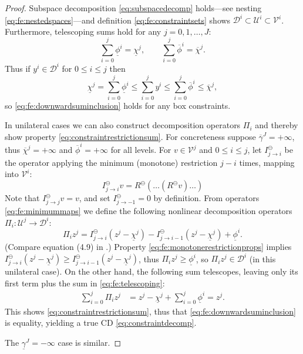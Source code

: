 \documentclass[letterpaper,final,12pt,reqno]{amsart}
\theoremstyle{cstyle}
\theoremstyle{cstyle*}
\theoremstyle{dstyle}
\numberwithin{equation}{section}
\numberwithin{figure}{section}
\numberwithin{table}{section}
\numberwithin{theorem}{section}
\newcommand{\cV}{\mathcal{V}}
\newcommand{\minR}{R^{\bm{\ominus}}}
\begin{document}
\begin{proof}  Subspace decomposition \eqref{eq:subspacedecomp} holds---see nesting \eqref{eq:fe:nestedspaces}---and definition \eqref{eq:fe:constraintsets} shows $\mathcal{D}^i \subset \mathcal{U}^i \subset \cV^i$.  Furthermore, telescoping sums hold for any $j=0,1,\dots,J$:
\begin{equation}
\sum_{i=0}^j \underline{\phi}^i = \underline{\chi}^j, \qquad \sum_{i=0}^j \overline{\phi}^i = \overline{\chi}^j.  \label{eq:fe:telescoping}
\end{equation}
Thus if $y^i \in \mathcal{D}^i$ for $0 \le i \le j$ then
\begin{equation}
\underline{\chi}^j = \sum_{i=0}^j \underline{\phi}^i \le \sum_{i=0}^j y^i \le \sum_{i=0}^j \overline{\phi}^i \le \overline{\chi}^j, \label{eq:fe:lemmaordering}
\end{equation}
so \eqref{eq:fe:downwardsuminclusion} holds for any box constraints.

In unilateral cases we can also construct decomposition operators $\Pi_i$ and thereby show property \eqref{eq:constraintrestrictionsum}.  For concreteness suppose $\overline{\gamma}^J=+\infty$, thus $\overline{\chi}^j=+\infty$ and $\overline{\phi}^i = +\infty$ for all levels.  For $v\in \mathcal{V}^j$ and $0\le i \le j$, let $I_{j\to i}^\ominus$ be the operator applying the minimum (monotone) restriction $j-i$ times, mapping into $\mathcal{V}^i$:
\begin{equation}
I_{j\to i}^\ominus v = \minR(\dots(\minR v)\dots)  \label{eq:fe:minimummaps}
\end{equation}
Note that $I_{j\to j}^\ominus v = v$, and set $I_{j\to -1}^\ominus=0$ by definition.  From operators \eqref{eq:fe:minimummaps} we define the following nonlinear decomposition operators $\Pi_i:\mathcal{U}^j \to \mathcal{D}^i$:
\begin{equation}
\Pi_i z^j = I_{j\to i}^\ominus(z^j - \underline{\chi}^j) - I_{j\to i-1}^\ominus(z^j - \underline{\chi}^j) + \underline{\phi}^i.  \label{eq:fe:unilateraldecompositionoperator}
\end{equation}
(Compare equation (4.9) in \cite{GraeserKornhuber2009}.)  Property \eqref{eq:fe:monotonerestrictionprops} implies $I_{j\to i}^\ominus(z^j - \underline{\chi}^j) \ge I_{j\to i-1}^\ominus(z^j - \underline{\chi}^j)$, thus $\Pi_i z^j \ge \underline{\phi}^i$, so $\Pi_i z^j \in \mathcal{D}^i$ (in this unilateral case).  On the other hand, the following sum telescopes, leaving only its first term plus the sum in \eqref{eq:fe:telescoping}:
\begin{align*}
\sum_{i=0}^j \Pi_i z^j &= z^j - \underline{\chi}^j + \sum_{i=0}^j \underline{\phi}^i = z^j.
\end{align*}
This shows \eqref{eq:constraintrestrictionsum}, thus that \eqref{eq:fe:downwardsuminclusion} is equality, yielding a true CD \eqref{eq:constraintdecomp}.

The $\underline{\gamma}^J=-\infty$ case is similar.
\end{proof}
\end{document}
